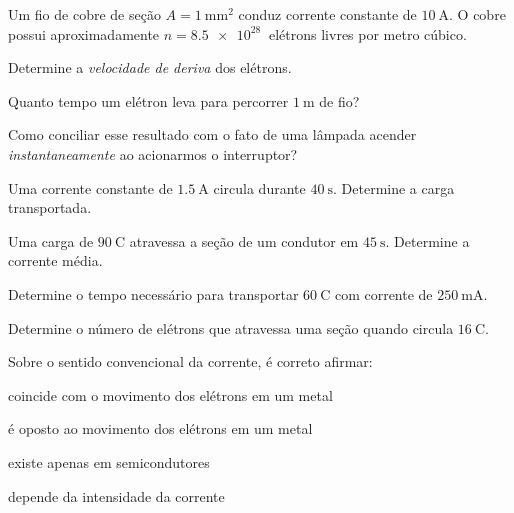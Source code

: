 \begin{questao}[3]{}

Um fio de cobre de seção $A = \SI{1}{\milli\meter\squared}$ conduz corrente
constante de $\SI{10}{\ampere}$. O cobre possui aproximadamente
$n = \SI{8.5e28}{}$ elétrons livres por metro cúbico.
\begin{itensq}
\item Determine a \emph{velocidade de deriva} dos elétrons.
\item Quanto tempo um elétron leva para percorrer $\SI{1}{\meter}$ de fio?
\item Como conciliar esse resultado com o fato de uma lâmpada acender
      \emph{instantaneamente} ao acionarmos o interruptor?
\end{itensq}


\end{questao}

\blocofixacao
\begin{questao}[1]{}

Uma corrente constante de $\SI{1.5}{\ampere}$ circula durante
$\SI{40}{\second}$. Determine a carga transportada.


\end{questao}
\begin{questao}[1]{}

Uma carga de $\SI{90}{\coulomb}$ atravessa a seção de um condutor em
$\SI{45}{\second}$. Determine a corrente média.


\end{questao}
\begin{questao}[1]{}

Determine o tempo necessário para transportar $\SI{60}{\coulomb}$ com corrente
de $\SI{250}{\milli\ampere}$.


\end{questao}
\begin{questao}[1]{}

Determine o número de elétrons que atravessa uma seção quando circula
$\SI{16}{\coulomb}$.


\end{questao}
\begin{questao}[1]{}

Sobre o sentido convencional da corrente, é correto afirmar:
\begin{alternativas}[2]
\item coincide com o movimento dos elétrons em um metal
\item é oposto ao movimento dos elétrons em um metal
\item existe apenas em semicondutores
\item depende da intensidade da corrente
\end{alternativas}


\end{questao}

